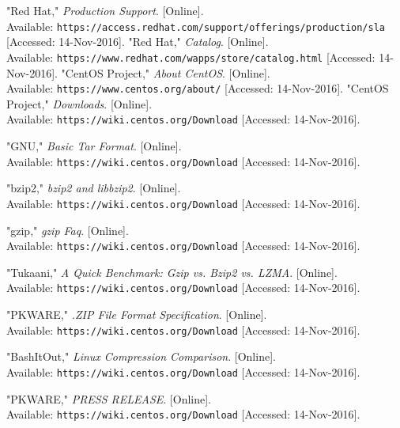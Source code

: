 \documentclass[letterpaper, 10pt,titlepage]{article}
\begin{document}
\begin{thebibliography}{22}
"Red Hat," \textit{Production Support}. [Online]. 
\\Available: \texttt{https://access.redhat.com/support/offerings/production/sla} [Accessed: 14-Nov-2016].
"Red Hat," \textit{Catalog}. [Online]. 
\\Available: \texttt{https://www.redhat.com/wapps/store/catalog.html} [Accessed: 14-Nov-2016].
"CentOS Project," \textit{About CentOS}. [Online]. 
\\Available: \texttt{https://www.centos.org/about/} [Accessed: 14-Nov-2016].
"CentOS Project," \textit{Downloads}. [Online]. 
\\Available: \texttt{https://wiki.centos.org/Download} [Accessed: 14-Nov-2016].




"GNU," \textit{Basic Tar Format}. [Online]. 
\\Available: \texttt{https://wiki.centos.org/Download} [Accessed: 14-Nov-2016].

"bzip2," \textit{bzip2 and libbzip2}. [Online]. 
\\Available: \texttt{https://wiki.centos.org/Download} [Accessed: 14-Nov-2016].

"gzip," \textit{gzip Faq}. [Online]. 
\\Available: \texttt{https://wiki.centos.org/Download} [Accessed: 14-Nov-2016].

"Tukaani," \textit{A Quick Benchmark: Gzip vs. Bzip2 vs. LZMA}. [Online]. 
\\Available: \texttt{https://wiki.centos.org/Download} [Accessed: 14-Nov-2016].


"PKWARE," \textit{.ZIP File Format Specification}. [Online]. 
\\Available: \texttt{https://wiki.centos.org/Download} [Accessed: 14-Nov-2016].



"BashItOut," \textit{Linux Compression Comparison}. [Online]. 
\\Available: \texttt{https://wiki.centos.org/Download} [Accessed: 14-Nov-2016].


"PKWARE," \textit{PRESS RELEASE}. [Online]. 
\\Available: \texttt{https://wiki.centos.org/Download} [Accessed: 14-Nov-2016].








\end{thebibliography}
\end{document}
